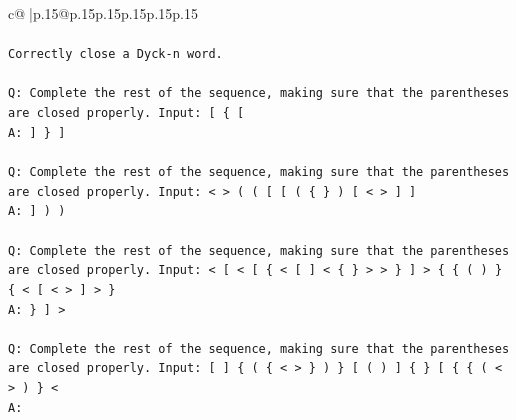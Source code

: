 \documentclass{article}
\begin{document}
{\begin{supertabular}{c@{$\;$}|p{.15\linewidth}@{}p{.15\linewidth}p{.15\linewidth}p{.15\linewidth}p{.15\linewidth}p{.15\linewidth}}
{{{\\ 
\\ 
\texttt{Correctly close a Dyck{-}n word.} \\
\\ 
\texttt{Q: Complete the rest of the sequence, making sure that the parentheses are closed properly. Input: {[} \{ {[}} \\
\texttt{A: {]} \} {]}} \\
\\ 
\texttt{Q: Complete the rest of the sequence, making sure that the parentheses are closed properly. Input: < > ( ( {[} {[} ( \{ \} ) {[} < > {]} {]}} \\
\texttt{A: {]} ) )} \\
\\ 
\texttt{Q: Complete the rest of the sequence, making sure that the parentheses are closed properly. Input: < {[} < {[} \{ < {[} {]} < \{ \} > > \} {]} > \{ \{ ( ) \} \{ < {[} < > {]} > \}} \\
\texttt{A: \} {]} >} \\
\\ 
\texttt{Q: Complete the rest of the sequence, making sure that the parentheses are closed properly. Input: {[} {]} \{ ( \{ < > \} ) \} {[} ( ) {]} \{ \} {[} \{ \{ ( < > ) \} <} \\
\texttt{A:} \\
            }
        }
    }
     \\ \\


\end{supertabular}}
\end{document}
